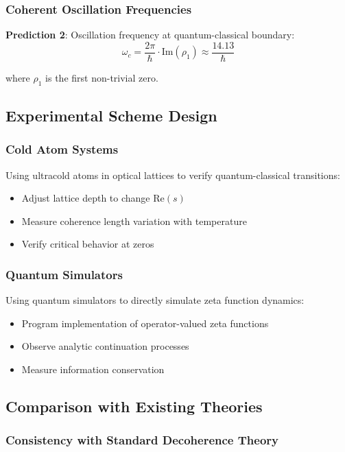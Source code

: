 \documentclass[11pt]{article}
\theoremstyle{plain}
\theoremstyle{definition}
\theoremstyle{remark}
\begin{document}
\subsubsection{Coherent Oscillation Frequencies}

\textbf{Prediction 2}: Oscillation frequency at quantum-classical boundary:
$$\omega_c = \frac{2\pi}{\hbar} \cdot \text{Im}(\rho_1) \approx \frac{14.13}{\hbar}$$

where $\rho_1$ is the first non-trivial zero.

\subsection{Experimental Scheme Design}

\subsubsection{Cold Atom Systems}

Using ultracold atoms in optical lattices to verify quantum-classical transitions:
\begin{itemize}
\item Adjust lattice depth to change $\text{Re}(s)$
\item Measure coherence length variation with temperature
\item Verify critical behavior at zeros
\end{itemize}

\subsubsection{Quantum Simulators}

Using quantum simulators to directly simulate zeta function dynamics:
\begin{itemize}
\item Program implementation of operator-valued zeta functions
\item Observe analytic continuation processes
\item Measure information conservation
\end{itemize}

\subsection{Comparison with Existing Theories}

\subsubsection{Consistency with Standard Decoherence Theory}
\end{document}
